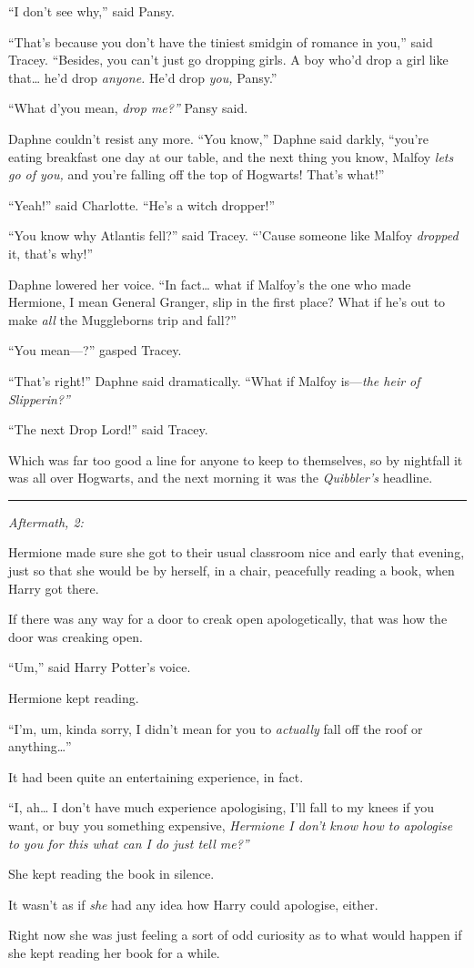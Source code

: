 ``I don't see why,'' said Pansy.

``That's because you don't have the tiniest smidgin of romance in you,''
said Tracey. ``Besides, you can't just go dropping girls. A boy who'd
drop a girl like that\ldots{} he'd drop \emph{anyone.} He'd drop
\emph{you,} Pansy.''

``What d'you mean, \emph{drop me?''} Pansy said.

Daphne couldn't resist any more. ``You know,'' Daphne said darkly,
``you're eating breakfast one day at our table, and the next thing you
know, Malfoy \emph{lets go of you,} and you're falling off the top of
Hogwarts! That's what!''

``Yeah!'' said Charlotte. ``He's a witch dropper!''

``You know why Atlantis fell?'' said Tracey. ``'Cause someone like
Malfoy \emph{dropped} it, that's why!''

Daphne lowered her voice. ``In fact\ldots{} what if Malfoy's the one who
made Hermione, I mean General Granger, slip in the first place? What if
he's out to make \emph{all} the Muggleborns trip and fall?''

``You mean---?'' gasped Tracey.

``That's right!'' Daphne said dramatically. ``What if Malfoy
is---\emph{the heir of Slipperin?''}

``The next Drop Lord!'' said Tracey.

Which was far too good a line for anyone to keep to themselves, so by
nightfall it was all over Hogwarts, and the next morning it was the
\emph{Quibbler's} headline.

\begin{center}\rule{3in}{0.4pt}\end{center}

\emph{Aftermath, 2:}

Hermione made sure she got to their usual classroom nice and early that
evening, just so that she would be by herself, in a chair, peacefully
reading a book, when Harry got there.

If there was any way for a door to creak open apologetically, that was
how the door was creaking open.

``Um,'' said Harry Potter's voice.

Hermione kept reading.

``I'm, um, kinda sorry, I didn't mean for you to \emph{actually} fall
off the roof or anything\ldots{}''

It had been quite an entertaining experience, in fact.

``I, ah\ldots{} I don't have much experience apologising, I'll fall to
my knees if you want, or buy you something expensive, \emph{Hermione I
don't know how to apologise to you for this what can I do just tell
me?''}

She kept reading the book in silence.

It wasn't as if \emph{she} had any idea how Harry could apologise,
either.

Right now she was just feeling a sort of odd curiosity as to what would
happen if she kept reading her book for a while.

